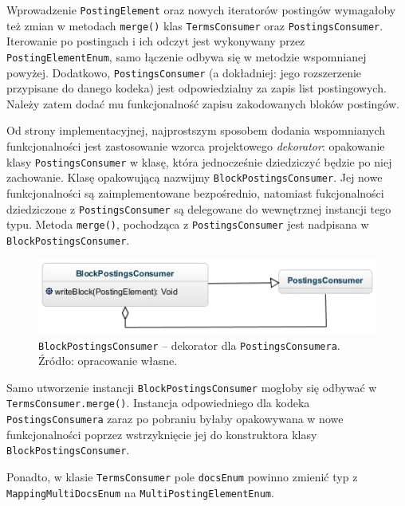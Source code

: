 \begin{enumerate}
\end{enumerate}

Wprowadzenie \texttt{PostingElement} oraz nowych iteratorów postingów wymagałoby też zmian w metodach \texttt{merge()} klas \texttt{TermsConsumer} oraz \texttt{PostingsConsumer}. Iterowanie po postingach i ich odczyt jest wykonywany przez \texttt{PostingElementEnum}, samo łączenie odbywa się w metodzie wspomnianej powyżej. Dodatkowo, \texttt{PostingsConsumer} (a dokładniej: jego rozszerzenie przypisane do danego kodeka) jest odpowiedzialny za zapis list postingowych. Należy zatem dodać mu funkcjonalność zapisu zakodowanych bloków postingów. 

Od strony implementacyjnej, najprostszym sposobem dodania wspomnianych funkcjonalności jest zastosowanie wzorca projektowego \emph{dekorator}: opakowanie klasy \texttt{PostingsConsumer} w klasę, która jednocześnie dziedziczyć będzie po niej zachowanie. Klasę opakowującą nazwijmy \texttt{BlockPostingsConsumer}. Jej nowe funkcjonalności są zaimplementowane bezpośrednio, natomiast fukcjonalności dziedziczone z \texttt{PostingsConsumer} są delegowane do wewnętrznej instancji tego typu. Metoda \texttt{merge()}, pochodząca z \texttt{PostingsConsumer} jest nadpisana w \texttt{BlockPostingsConsumer}.

\begin{figure}[here]
 \centering
 \includegraphics[scale=0.8]{pictures/PostingsConsumerWrapper.jpg}
 \caption{\texttt{BlockPostingsConsumer} -- dekorator dla \texttt{PostingsConsumera}. Źródło: opracowanie własne. \label{fig:postingsConsumerWrapper}}
\end{figure}

Samo utworzenie instancji \texttt{BlockPostingsConsumer} mogłoby się odbywać w \texttt{TermsConsumer.merge()}. Instancja odpowiedniego dla kodeka \texttt{PostingsConsumera} zaraz po pobraniu byłaby opakowywana w nowe funkcjonalności poprzez wstrzyknięcie jej do konstruktora klasy \texttt{BlockPostingsConsumer}.

Ponadto, w klasie \texttt{TermsConsumer} pole \texttt{docsEnum} powinno zmienić typ z \texttt{MappingMultiDocsEnum} na \texttt{MultiPostingElementEnum}.

